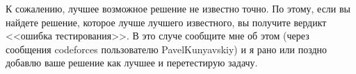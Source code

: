 К сожалению, лучшее возможное решение не известно точно. По этому, если вы найдете решение, которое лучше лучшего известного, вы получите вердикт <<ошибка тестирования>>. В это случе сообщите мне об этом (через сообщения codeforces пользователю PavelKunyavskiy) и я рано или поздно добавлю ваше решение как лучшее и перетестирую задачу.
